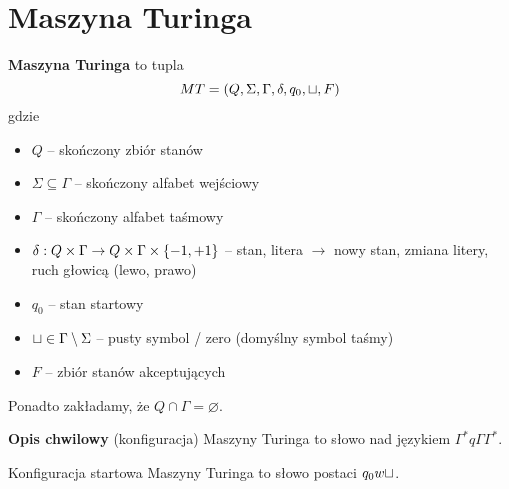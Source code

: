 \section{Maszyna Turinga}

\begin{definition}

 \textbf{Maszyna Turinga} to tupla
    \[
        MT = (Q, \Sigma, \Gamma, \delta, q_0, \sqcup, F)
    \]
    gdzie
    \begin{itemize}
        \item \( Q \) -- skończony zbiór stanów
        \item \( \Sigma \subseteq \Gamma \) -- skończony alfabet wejściowy
        \item \( \Gamma \) -- skończony alfabet taśmowy
        \item \( \delta : Q \times \Gamma \rightarrow 
        Q \times \Gamma \times \set{-1, +1}
        \) -- stan, litera \( \rightarrow \) nowy stan, zmiana litery, ruch głowicą (lewo, prawo)
        \item \( q_0 \) -- stan startowy
        \item \( \sqcup \in \Gamma \setminus \Sigma \) -- pusty symbol / zero (domyślny symbol taśmy)
        \item \( F \) -- zbiór stanów akceptujących
    \end{itemize}
    
    Ponadto zakładamy, że \(Q \cap \Gamma = \varnothing\). 
\end{definition}

\begin{definition}
    \textbf{Opis chwilowy} (konfiguracja) Maszyny Turinga to słowo nad językiem \(\Gamma^* q\Gamma \Gamma^* \). 
\end{definition}

\begin{definition}
    Konfiguracja startowa Maszyny Turinga to słowo postaci \(q_0w\sqcup\).
\end{definition}

